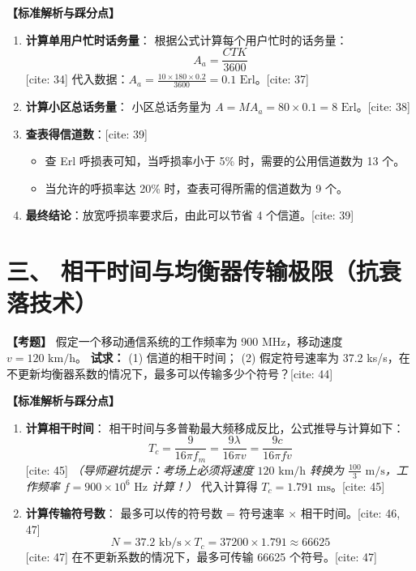 \documentclass[12pt, a4paper]{ctexart}
\begin{document}
	\vspace{0.5em}
	\noindent\textbf{【标准解析与踩分点】}
	\begin{enumerate}[label=\arabic*.]
		\item \textbf{计算单用户忙时话务量}：
		根据公式计算每个用户忙时的话务量：
		$$A_{a} = \frac{CTK}{3600}$$ [cite: 34]
		代入数据：$A_{a} = \frac{10 \times 180 \times 0.2}{3600} = 0.1 \text{ Erl}$。[cite: 37]
		\item \textbf{计算小区总话务量}：
		小区总话务量为 $A = M A_{a} = 80 \times 0.1 = 8 \text{ Erl}$。[cite: 38]
		\item \textbf{查表得信道数}：[cite: 39]
		\begin{itemize}
			\item 查 Erl 呼损表可知，当呼损率小于 5\% 时，需要的公用信道数为 13 个。
			\item 当允许的呼损率达 20\% 时，查表可得所需的信道数为 9 个。
		\end{itemize}
		\item \textbf{最终结论}：放宽呼损率要求后，由此可以节省 4 个信道。[cite: 39]
	\end{enumerate}

	\vspace{1.5em}

	\section*{三、 相干时间与均衡器传输极限（抗衰落技术）}

	\textbf{【考题】}
	假定一个移动通信系统的工作频率为 900 MHz，移动速度 $v = 120 \text{ km/h}$。
	\textbf{试求：}
	(1) 信道的相干时间；
	(2) 假定符号速率为 37.2 ks/s，在不更新均衡器系数的情况下，最多可以传输多少个符号？[cite: 44]

	\vspace{0.5em}
	\noindent\textbf{【标准解析与踩分点】}
	\begin{enumerate}[label=\arabic*.]
		\item \textbf{计算相干时间}：
		相干时间与多普勒最大频移成反比，公式推导与计算如下：
		$$T_{c} = \frac{9}{16\pi f_{m}} = \frac{9\lambda}{16\pi v} = \frac{9c}{16\pi fv}$$ [cite: 45]
		\textit{（导师避坑提示：考场上必须将速度 $120 \text{ km/h}$ 转换为 $\frac{100}{3} \text{ m/s}$，工作频率 $f = 900 \times 10^6 \text{ Hz}$ 计算！）}
		代入计算得 $T_{c} = 1.791 \text{ ms}$。[cite: 45]
		\item \textbf{计算传输符号数}：
		最多可以传的符号数 = 符号速率 $\times$ 相干时间。[cite: 46, 47]
		$$N = 37.2 \text{ kb/s} \times T_{c} = 37200 \times 1.791 \approx 66625$$ [cite: 47]
		在不更新系数的情况下，最多可传输 66625 个符号。[cite: 47]
	\end{enumerate}
\end{document}
